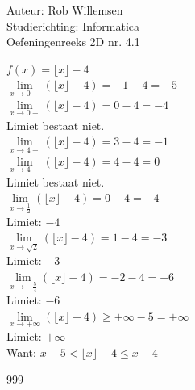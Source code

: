 \documentclass[a4paper]{article}
\begin{document}
\noindent \large Auteur: Rob Willemsen \\
\noindent \large Studierichting: Informatica\\
\noindent \large Oefeningenreeks 2D nr. 4.1\\

\medskip

\normalsize

$f(x) = \lfloor x \rfloor - 4$ \\

$\lim\limits_{x \rightarrow 0-} (\lfloor x \rfloor - 4) = -1 - 4 = -5$ \\

$\lim\limits_{x \rightarrow 0+} (\lfloor x \rfloor - 4) = 0 - 4 = -4$ \\

Limiet bestaat niet. \\

$\lim\limits_{x \rightarrow 4-} (\lfloor x \rfloor - 4) = 3 - 4 = -1$ \\

$\lim\limits_{x \rightarrow 4+} (\lfloor x \rfloor - 4) = 4 - 4 = 0$ \\

Limiet bestaat niet. \\

$\lim\limits_{x \rightarrow \tfrac{1}{2}} (\lfloor x \rfloor - 4) = 0 - 4 = -4$ \\

Limiet: $-4$ \\

$\lim\limits_{x \rightarrow \sqrt{2}} (\lfloor x \rfloor - 4) = 1 - 4 = -3$ \\

Limiet: $-3$ \\

$\lim\limits_{x \rightarrow -\tfrac{5}{4}} (\lfloor x \rfloor - 4) = -2 - 4 = -6$ \\

Limiet: $-6$ \\

$\lim\limits_{x \rightarrow +\infty} (\lfloor x \rfloor - 4) \geq +\infty - 5 = +\infty $ \\

Limiet: $+\infty$ \\

Want: $x - 5 < \lfloor x \rfloor - 4 \leq x - 4$ \\

\begin{thebibliography}{999}
\end{thebibliography}
\end{document}
